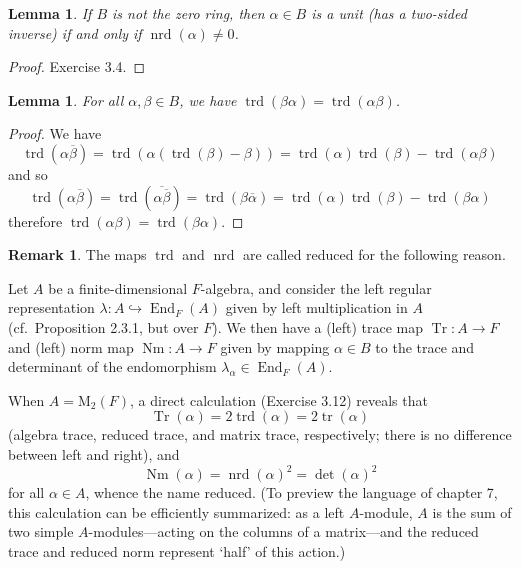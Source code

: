 \documentclass{article}
\newtheorem{lemma}[theorem]{Lemma}
\theoremstyle{definition}
\newtheorem{remark}[theorem]{Remark}
\begin{document}
\begin{lemma}
If $B$ is not the zero ring, then $\alpha \in B$ is a unit (has a two-sided inverse) if and only if $\operatorname{nrd}(\alpha) \neq 0$.
\end{lemma}

\begin{proof}
Exercise 3.4.
\end{proof}

\begin{lemma}
For all $\alpha, \beta \in B$, we have $\operatorname{trd}(\beta\alpha) = \operatorname{trd}(\alpha\beta)$.
\end{lemma}

\begin{proof}
We have
$$\operatorname{trd}(\alpha \overline{\beta}) = \operatorname{trd}(\alpha (\operatorname{trd}(\beta) - \beta)) = \operatorname{trd}(\alpha) \operatorname{trd}(\beta) - \operatorname{trd}(\alpha \beta)$$
and so
$$\operatorname{trd}(\alpha \overline{\beta}) = \operatorname{trd}(\overline{\alpha \overline{\beta}}) = \operatorname{trd}(\beta \overline{\alpha}) = \operatorname{trd}(\alpha) \operatorname{trd}(\beta) - \operatorname{trd}(\beta \alpha)$$
therefore $\operatorname{trd}(\alpha \beta) = \operatorname{trd}(\beta \alpha)$.
\end{proof}

\begin{remark}
The maps $\operatorname{trd}$ and $\operatorname{nrd}$ are called reduced for the following reason.

Let $A$ be a finite-dimensional $F$-algebra, and consider the left regular representation $\lambda: A \hookrightarrow \operatorname{End}_F(A)$ given by left multiplication in $A$ (cf.\ Proposition 2.3.1, but over $F$). We then have a (left) trace map $\operatorname{Tr}: A \to F$ and (left) norm map $\operatorname{Nm}: A \to F$ given by mapping $\alpha \in B$ to the trace and determinant of the endomorphism $\lambda_\alpha \in \operatorname{End}_F(A)$.

When $A = \mathrm{M}_2(F)$, a direct calculation (Exercise 3.12) reveals that
$$\operatorname{Tr}(\alpha) = 2 \operatorname{trd}(\alpha) = 2 \operatorname{tr}(\alpha)$$
(algebra trace, reduced trace, and matrix trace, respectively; there is no difference between left and right), and
$$\operatorname{Nm}(\alpha) = \operatorname{nrd}(\alpha)^2 = \det(\alpha)^2$$
for all $\alpha \in A$, whence the name reduced. (To preview the language of chapter 7, this calculation can be efficiently summarized: as a left $A$-module, $A$ is the sum of two simple $A$-modules---acting on the columns of a matrix---and the reduced trace and reduced norm represent `half' of this action.)
\end{remark}
\end{document}
